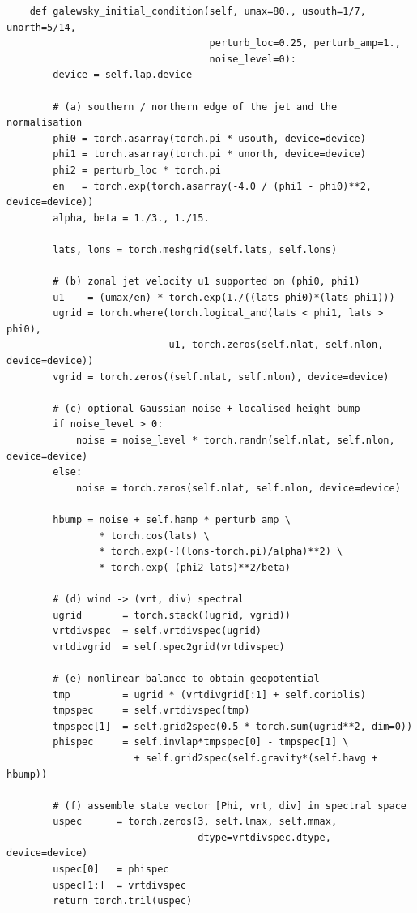 \documentclass[11pt]{article}
\begin{document}
\begin{lstlisting}
    def galewsky_initial_condition(self, umax=80., usouth=1/7, unorth=5/14,
                                   perturb_loc=0.25, perturb_amp=1.,
                                   noise_level=0):
        device = self.lap.device

        # (a) southern / northern edge of the jet and the normalisation
        phi0 = torch.asarray(torch.pi * usouth, device=device)
        phi1 = torch.asarray(torch.pi * unorth, device=device)
        phi2 = perturb_loc * torch.pi
        en   = torch.exp(torch.asarray(-4.0 / (phi1 - phi0)**2, device=device))
        alpha, beta = 1./3., 1./15.

        lats, lons = torch.meshgrid(self.lats, self.lons)

        # (b) zonal jet velocity u1 supported on (phi0, phi1)
        u1    = (umax/en) * torch.exp(1./((lats-phi0)*(lats-phi1)))
        ugrid = torch.where(torch.logical_and(lats < phi1, lats > phi0),
                            u1, torch.zeros(self.nlat, self.nlon, device=device))
        vgrid = torch.zeros((self.nlat, self.nlon), device=device)

        # (c) optional Gaussian noise + localised height bump
        if noise_level > 0:
            noise = noise_level * torch.randn(self.nlat, self.nlon, device=device)
        else:
            noise = torch.zeros(self.nlat, self.nlon, device=device)

        hbump = noise + self.hamp * perturb_amp \
                * torch.cos(lats) \
                * torch.exp(-((lons-torch.pi)/alpha)**2) \
                * torch.exp(-(phi2-lats)**2/beta)

        # (d) wind -> (vrt, div) spectral
        ugrid       = torch.stack((ugrid, vgrid))
        vrtdivspec  = self.vrtdivspec(ugrid)
        vrtdivgrid  = self.spec2grid(vrtdivspec)

        # (e) nonlinear balance to obtain geopotential
        tmp         = ugrid * (vrtdivgrid[:1] + self.coriolis)
        tmpspec     = self.vrtdivspec(tmp)
        tmpspec[1]  = self.grid2spec(0.5 * torch.sum(ugrid**2, dim=0))
        phispec     = self.invlap*tmpspec[0] - tmpspec[1] \
                      + self.grid2spec(self.gravity*(self.havg + hbump))

        # (f) assemble state vector [Phi, vrt, div] in spectral space
        uspec      = torch.zeros(3, self.lmax, self.mmax,
                                 dtype=vrtdivspec.dtype, device=device)
        uspec[0]   = phispec
        uspec[1:]  = vrtdivspec
        return torch.tril(uspec)
\end{lstlisting}
\end{document}
